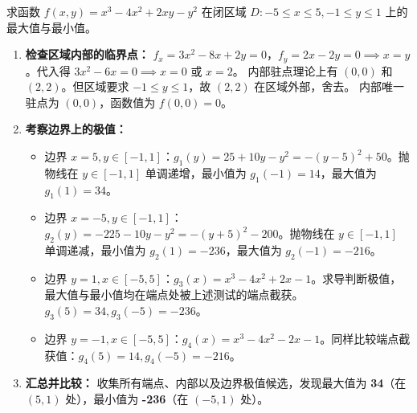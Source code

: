 \documentclass[lang=cn,11pt]{elegantbook}
\begin{document}
\begin{exercise}[有界闭区域求最值]
求函数 $f(x,y)=x^3-4x^2+2xy-y^2$ 在闭区域 $D:-5\leq x\leq5,-1\leq y\leq1$ 上的最大值与最小值。
\end{exercise}
\begin{solution}
\begin{enumerate}
  \item \textbf{检查区域内部的临界点：}
  $f_x = 3x^2-8x+2y = 0$，$f_y = 2x-2y = 0 \implies x=y$。代入得 $3x^2-6x=0 \implies x=0$ 或 $x=2$。
  内部驻点理论上有 $(0,0)$ 和 $(2,2)$。但区域要求 $-1 \leq y \leq 1$，故 $(2,2)$ 在区域外部，舍去。
  内部唯一驻点为 $(0,0)$，函数值为 $f(0,0)=0$。

  \item \textbf{考察边界上的极值：}
  \begin{itemize}
    \item 边界 $x=5, y \in [-1,1]$：$g_1(y) = 25+10y-y^2 = -(y-5)^2+50$。抛物线在 $y \in [-1,1]$ 单调递增，最小值为 $g_1(-1)=14$，最大值为 $g_1(1)=34$。
    \item 边界 $x=-5, y \in [-1,1]$：$g_2(y) = -225-10y-y^2 = -(y+5)^2-200$。抛物线在 $y \in [-1,1]$ 单调递减，最小值为 $g_2(1)=-236$，最大值为 $g_2(-1)=-216$。
    \item 边界 $y=1, x \in [-5,5]$：$g_3(x) = x^3-4x^2+2x-1$。求导判断极值，最大值与最小值均在端点处被上述测试的端点截获。$g_3(5)=34, g_3(-5)=-236$。
    \item 边界 $y=-1, x \in [-5,5]$：$g_4(x) = x^3-4x^2-2x-1$。同样比较端点截获值：$g_4(5)=14, g_4(-5)=-216$。
  \end{itemize}

  \item \textbf{汇总并比较：}
  收集所有端点、内部以及边界极值候选，发现最大值为 \textbf{34}（在 $(5,1)$ 处），最小值为 \textbf{-236}（在 $(-5,1)$ 处）。
\end{enumerate}
\end{solution}
\end{document}

